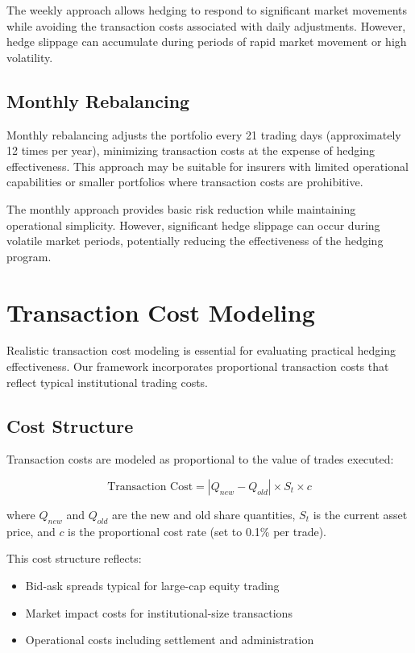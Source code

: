 \documentclass[12pt,a4paper]{report}
\begin{document}
The weekly approach allows hedging to respond to significant market movements while avoiding the transaction costs associated with daily adjustments. However, hedge slippage can accumulate during periods of rapid market movement or high volatility.

\subsection{Monthly Rebalancing}

Monthly rebalancing adjusts the portfolio every 21 trading days (approximately 12 times per year), minimizing transaction costs at the expense of hedging effectiveness. This approach may be suitable for insurers with limited operational capabilities or smaller portfolios where transaction costs are prohibitive.

The monthly approach provides basic risk reduction while maintaining operational simplicity. However, significant hedge slippage can occur during volatile market periods, potentially reducing the effectiveness of the hedging program.

\section{Transaction Cost Modeling}

Realistic transaction cost modeling is essential for evaluating practical hedging effectiveness. Our framework incorporates proportional transaction costs that reflect typical institutional trading costs.

\subsection{Cost Structure}

Transaction costs are modeled as proportional to the value of trades executed:

\begin{equation}
\text{Transaction Cost} = |Q_{new} - Q_{old}| \times S_t \times c
\end{equation}

where $Q_{new}$ and $Q_{old}$ are the new and old share quantities, $S_t$ is the current asset price, and $c$ is the proportional cost rate (set to 0.1\% per trade).

This cost structure reflects:
\begin{itemize}
\item Bid-ask spreads typical for large-cap equity trading
\item Market impact costs for institutional-size transactions
\item Operational costs including settlement and administration
\end{itemize}
\end{document}
